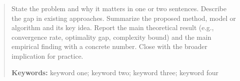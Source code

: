 \begin{abstract}
State the problem and why it matters in one or two sentences. Describe the gap in existing approaches. Summarize the proposed method, model or algorithm and its key idea. Report the main theoretical result (e.g., convergence rate, optimality gap, complexity bound) and the main empirical finding with a concrete number. Close with the broader implication for practice.

\medskip\noindent\textbf{Keywords:} keyword one; keyword two; keyword three; keyword four
\end{abstract}

